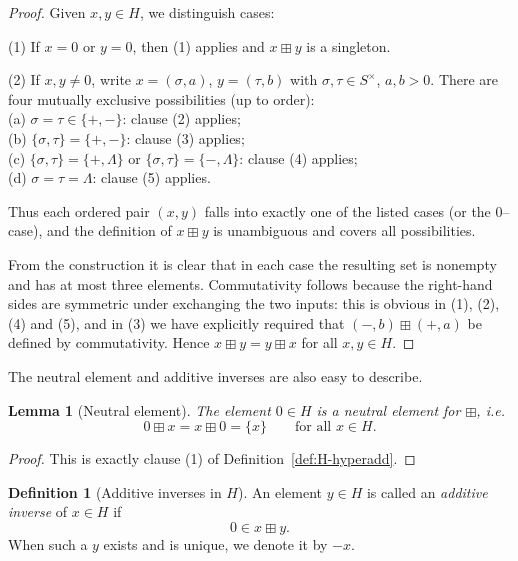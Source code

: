 \documentclass[11pt]{amsart}
\numberwithin{equation}{section}
\newtheorem{lemma}[theorem]{Lemma}
\theoremstyle{definition}
\newtheorem{definition}[theorem]{Definition}
\theoremstyle{remark}
\newcommand{\Hnum}{H}                      %
\newcommand{\Snon}{S^{\times}}             %
\newcommand{\op}{\boxplus}                 %
\begin{document}
\begin{proof}
Given $x,y\in\Hnum$, we distinguish cases:

\smallskip
\noindent
(1) If $x=0$ or $y=0$, then (1) applies and $x\op y$ is a singleton.

\smallskip
\noindent
(2) If $x,y\ne0$, write $x=(\sigma,a)$, $y=(\tau,b)$ with
$\sigma,\tau\in\Snon$, $a,b>0$.  There are four mutually exclusive
possibilities (up to order):\\[2pt]
\quad(a) $\sigma=\tau\in\{+,-\}$: clause (2) applies;\\
\quad(b) $\{\sigma,\tau\}=\{+,-\}$: clause (3) applies;\\
\quad(c) $\{\sigma,\tau\}=\{+,\Lambda\}$ or $\{\sigma,\tau\}
          =\{-,\Lambda\}$: clause (4) applies;\\
\quad(d) $\sigma=\tau=\Lambda$: clause (5) applies.

Thus each ordered pair $(x,y)$ falls into exactly one of the listed
cases (or the $0$--case), and the definition of $x\op y$ is unambiguous
and covers all possibilities.

From the construction it is clear that in each case the resulting set
is nonempty and has at most three elements.  Commutativity follows
because the right-hand sides are symmetric under exchanging the two
inputs: this is obvious in (1), (2), (4) and (5), and in (3) we have
explicitly required that $(-,b)\op(+,a)$ be defined by commutativity.
Hence $x\op y=y\op x$ for all $x,y\in\Hnum$.
\end{proof}

The neutral element and additive inverses are also easy to describe.

\begin{lemma}[Neutral element]\label{lem:H-add-neutral}
The element $0\in\Hnum$ is a neutral element for $\op$, i.e.
\[
  0\op x = x\op 0 = \{x\}
  \qquad\text{for all }x\in\Hnum.
\]
\end{lemma}

\begin{proof}
This is exactly clause (1) of Definition~\ref{def:H-hyperadd}.
\end{proof}

\begin{definition}[Additive inverses in $\Hnum$]\label{def:H-add-inverse}
An element $y\in\Hnum$ is called an \emph{additive inverse} of
$x\in\Hnum$ if
\[
  0\in x\op y.
\]
When such a $y$ exists and is unique, we denote it by $-x$.
\end{definition}
\end{document}
